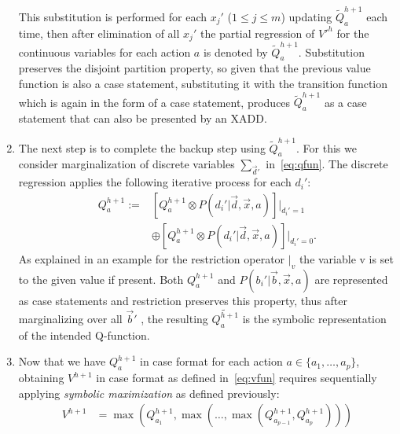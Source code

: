 \documentclass[letterpaper]{article}
\renewcommand{\-}{\text{-}}
\begin{document}
\begin{enumerate}
This substitution is performed for each $x_j'$ ($1 \leq j \leq m$) updating $\tilde{Q}_a^{h+1}$ each time,
then after elimination of all $x_j'$ the partial regression of $V'^{h}$ for the continuous variables for
each action $a$ is denoted by $\tilde{Q}_a^{h+1}$. Substitution preserves the disjoint partition property, so given that the previous value function is also a case statement, substituting it with the transition function which is again in the form of a case statement, produces $\tilde{Q}_a^{h+1}$ as a case statement that can also be presented by an XADD.

\item The next step is to complete the backup step using $\tilde{Q}_a^{h+1}$. 
For this we consider marginalization of discrete variables $\sum_{\vec{d}'}$ in~\eqref{eq:qfun}.
The discrete regression applies the following iterative process for each $d_i'$:
\begin{align}
Q_a^{h+1} := & \left[ Q_a^{h+1} \otimes P(d_i'|\vec{d},\vec{x},a) \right]|_{d_i' = 1} \nonumber \\
 & \oplus \left[ Q_a^{h+1} \otimes P(d_i'|\vec{d},\vec{x},a) \right]|_{d_i' = 0}.
\end{align}
As explained in an example for the restriction operator $|_v$ the variable v is set to the given value if present.
Both $Q_a^{h+1}$ and $P(b_i'|\vec{b},\vec{x},a)$ are represented
as case statements and restriction preserves this property, thus after marginalizing over all $\vec{b}'$ , the resulting $ \tilde{Q_a^{h+1}}$ is the symbolic representation
of the intended Q-function.

\item Now that we have $Q_a^{h+1}$ in
case format for each action $a \in \{a_1,\ldots,a_p\}$, obtaining
$V^{h+1}$ in case format as defined in~\eqref{eq:vfun} requires
sequentially applying
\emph{symbolic maximization} as defined previously:
\begin{align*}
V^{h+1} & = 
\max(Q_{a_1}^{h+1},\max(\ldots,\max(Q_{a_{p-1}}^{h+1},Q_{a_p}^{h+1})))
\end{align*}
\end{enumerate}
\end{document}
